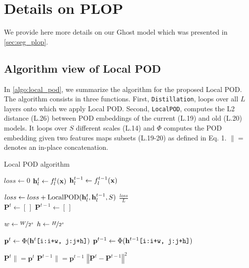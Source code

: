 \section{Details on PLOP}
\label{sec:appendix_plop}

We provide here more details on our Ghost model which was presented in \autoref{sec:seg_plop}.

\subsection{Algorithm view of Local POD}

In \autoref{algo:local_pod}, we summarize the algorithm for the proposed Local POD. The algorithm
consists in three functions. First, \texttt{Distillation}, loops over all $L$ layers onto which we
apply Local POD. Second, \texttt{LocalPOD}, computes the L2 distance (L.26) between POD embeddings
of the current (L.19) and old (L.20) models. It loops over $S$ different scales (L.14) and $\Phi$
computes the POD embedding given two features maps subsets (L.19-20) as defined in Eq. 1. $\|=$
denotes an in-place concatenation.

\begin{algorithm}
    \caption{Local POD algorithm}
    \label{algo:local_pod}
    \begin{algorithmic}[1]
         \State $loss \gets 0$  \State $\mathbf{h}^t_l \gets f^t_l(\mathbf{x})$ \State $\mathbf{h}^{t-1}_l \gets
            f^{t-1}_l(\mathbf{x})$

        \State $loss \gets loss + \operatorname{LocalPOD}(\mathbf{h}^t_l, \mathbf{h}^{t-1}_l, S)$ \EndFor \State
        \Return $\frac{loss}{L}$ \EndFunction \\
         \State $\mathbf{P}^t \gets [\,]$ \State
        $\mathbf{P}^{t-1} \gets [\,]$

          \State $w \gets
            \nicefrac{W}{2^s}$ \State $h \gets \nicefrac{H}{2^s}$

          \State $\mathbf{p}^t \gets \operatorname{\Phi}(\mathbf{h}^t\texttt{[i:i+w, j:j+h]})$
        \State $\mathbf{p}^{t-1} \gets \operatorname{\Phi}(\mathbf{h}^{t-1}\texttt{[i:i+w,
                j:j+h]})$

        \State $\mathbf{P}^t \|= \mathbf{p}^t$ \State $\mathbf{P}^{t-1} \|= \mathbf{p}^{t-1}$ \EndFor \EndFor
        \EndFor \State \Return $\left\Vert \mathbf{P}^t - \mathbf{P}^{t-1}\right\Vert^2$
         \EndFunction
    \end{algorithmic}
\end{algorithm}

